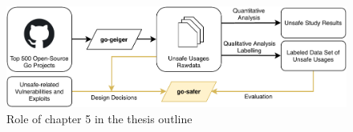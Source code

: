 \begin{figure}[ht]
    \includegraphics[width=\textwidth]{assets/figures/chapter5/outline5.pdf}
    \caption{Role of chapter 5 in the thesis outline}
    \label{fig:outline5}
\end{figure}

